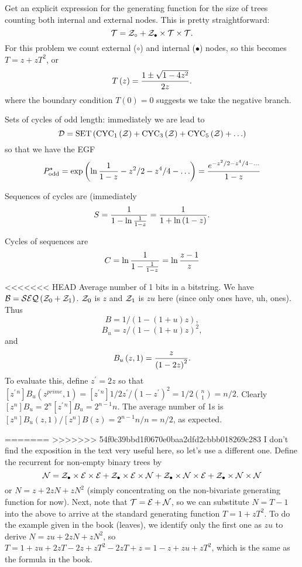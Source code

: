 \vskip 0.08in  Get an explicit expression for the 
generating function for the size of trees counting both internal and external nodes.
This is pretty straightforward: 
$$
 {\cal T} = {\cal Z}_{\circ} + {\cal Z}_{\bullet} \times {\cal T} \times {\cal T}.
$$
For this problem we count external ($\circ$) and internal ($\bullet$) nodes,
so this becomes $T = z + z T^2$, or
$$
 T\left(z\right) = {1 \pm \sqrt{1 - 4 z^2} \over 2 z}.
$$
where the boundary condition $T\left(0\right) = 0$ suggests we take the negative branch.

\vskip 0.08in  Sets of cycles of odd length:
immediately we are lead to 
$$
{\cal D} = {\rm SET} \left(
{\rm CYC}_1\left({\cal Z}\right) + {\rm CYC}_3 \left({\cal Z}\right) +
 {\rm CYC}_5 \left({\cal Z}\right) + \ldots \right)
 $$
 so that we have the EGF
 $$
 P^{\star}_{\rm odd} = \exp \left( \ln {1 \over 1 - z } - z^2/2 - z^4/4 - \ldots\right)
  = { e^{-z^2/2 - z^4/4 - \ldots} \over 1 - z }
$$

\vskip 0.08in  Sequences of cycles are (immediately
$$
  S = {1 \over {1 - \ln {1 \over 1 - z}}} = {1 \over 1 + \ln \left(1 - z\right)}.
$$

\vskip 0.08in  Cycles of sequences are
$$
 C = \ln {1 \over {1 - {1 \over 1 - z}}} = \ln {z - 1 \over z}
$$

<<<<<<< HEAD
\vskip 0.08in  Average number of 1 bits in a bitstring.\hfil\break
We have ${\cal B} = {\cal SEQ}\left({\cal Z}_0 + {\cal Z}_1\right)$.  ${\cal Z}_0$
is $z$ and ${\cal Z}_1$ is $zu$ here (since only ones have, uh, ones).
Thus 
$$
 B = 1 / \left(1 - \left(1 + u\right) z\right),
$$
$$
B_u = z / \left(1 - \left(1 + u\right) z\right)^2 ,
$$ 
and
$$
 B_u\left(z, 1\right) = {z \over \left(1 - 2 z\right)^2} .
$$
To evaluate this, define $z^{\prime} = 2 z$ so that $\left[z^{\prime\,n}\right] B_u\left(z^{prime},1\right) =
\left[z^{\prime\, n}\right] 1/2 z^{\prime} / \left(1 - z^{\prime}\right)^2 = 1 / 2 {n \choose 1} = n / 2$.
Clearly $\left[z^n\right] B_u = 2^n \left[z^{\prime\,n}\right] B_u = 2^{n-1} n$.  The
average number of 1s is $\left[z^n\right] B_u\left(z, 1\right) / \left[z^n\right] B\left(z\right) =
2^{n-1} n / n = n / 2$, as expected.

=======
>>>>>>> 54f0c39bbd1f0670e0baa2dfd2cbbb018269c283
\vskip 0.08in  I don't find the exposition in the
text very useful here, so let's use a different one.  Define the recurrent for
non-empty binary trees by
$$
 {\cal N} = {\cal Z}_{\bullet} \times {\cal E} \times {\cal E}
 + {\cal Z}_{\bullet} \times {\cal E} \times {\cal N}
 + {\cal Z}_{\bullet} \times {\cal N} \times {\cal E}
 + {\cal Z}_{\bullet} \times {\cal N} \times {\cal N}
$$
or $N = z + 2 z N + z N^2$ (simply concentrating on the non-bivariate
generating function for now).  Next, note that ${\cal T} = {\cal E} + {\cal N}$,
so we can substitute $N = T - 1$ into the above to arrive at the standard
generating function $T = 1 + z T^2$.  To do the example given in the book
(leaves), we identify only the first one as $z u$ to derive
$N = z u + 2 z N + z N^2$, so $T = 1 + zu + 2 z T - 2z + z T^2 - 2 z T + z =
1 - z + z u + z T^2$, which is the same as the formula in the book.

